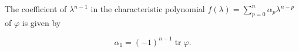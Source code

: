 The coefficient of $\lambda^{n-1}$ in the characteristic polynomial $f(\lambda) = \sum_{p=0}^{n} \alpha_p \lambda^{n-p}$ of $\varphi$ is given by

$$\alpha_1 = (-1)^{n-1} \operatorname{tr} \varphi.$$
